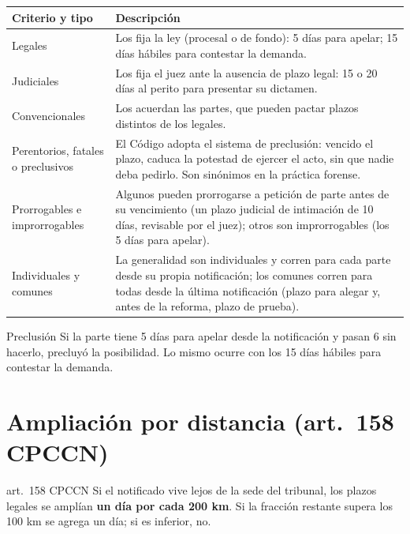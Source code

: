 \documentclass[12pt,oneside]{book}
\renewcommand{\arraystretch}{1.15}
\begin{document}
\begin{table}[H]
\centering
\renewcommand{\arraystretch}{1.25}
\begin{tabularx}{\textwidth}{>{\RaggedRight\arraybackslash}p{}>{\RaggedRight\arraybackslash}X}
\toprule
\textbf{Criterio y tipo} & \textbf{Descripción} \\
\midrule
Legales & Los fija la ley (procesal o de fondo): 5 días para apelar; 15 días hábiles para contestar la demanda. \\
\addlinespace
Judiciales & Los fija el juez ante la ausencia de plazo legal: 15 o 20 días al perito para presentar su dictamen. \\
\addlinespace
Convencionales & Los acuerdan las partes, que pueden pactar plazos distintos de los legales. \\
\addlinespace
Perentorios, fatales o preclusivos & El Código adopta el sistema de preclusión: vencido el plazo, caduca la potestad de ejercer el acto, sin que nadie deba pedirlo. Son sinónimos en la práctica forense. \\
\addlinespace
Prorrogables e improrrogables & Algunos pueden prorrogarse a petición de parte antes de su vencimiento (un plazo judicial de intimación de 10 días, revisable por el juez); otros son improrrogables (los 5 días para apelar). \\
\addlinespace
Individuales y comunes & La generalidad son individuales y corren para cada parte desde su propia notificación; los comunes corren para todas desde la última notificación (plazo para alegar y, antes de la reforma, plazo de prueba). %
\\
\bottomrule
\end{tabularx}
\end{table}

\begin{ejemplo}{Preclusión}
Si la parte tiene 5 días para apelar desde la notificación y pasan 6 sin hacerlo, precluyó la posibilidad. Lo mismo ocurre con los 15 días hábiles para contestar la demanda.
\end{ejemplo}

\section{Ampliación por distancia (art.~158 CPCCN)}

\begin{regla}{art.~158 CPCCN}
Si el notificado vive lejos de la sede del tribunal, los plazos legales se amplían \textbf{un día por cada 200 km}. Si la fracción restante supera los 100 km se agrega un día; si es inferior, no.
\end{regla}
\end{document}
